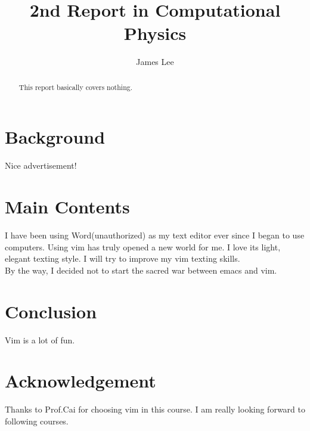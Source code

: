 \documentclass[10pt,a4paper]{article}
\author{James Lee}
\title{2nd Report in Computational Physics}
\begin{document}
    \maketitle
    \begin{abstract}
    This report basically covers nothing.
    \end{abstract}
    \section{Background}
    Nice advertisement!
    \section{Main Contents}
    I have been using Word(unauthorized) as my text editor ever since I began to use computers. Using vim has truly opened a new world for me. I love its light, elegant texting style. I will try to improve my vim texting skills.\\
    By the way, I decided not to start the sacred war between emacs and vim.\\ 
    \section{Conclusion}
    Vim is a lot of fun.
    \section{Acknowledgement}
    Thanks to Prof.Cai for choosing vim in this course. I am really looking forward to following courses.
\end{document}
